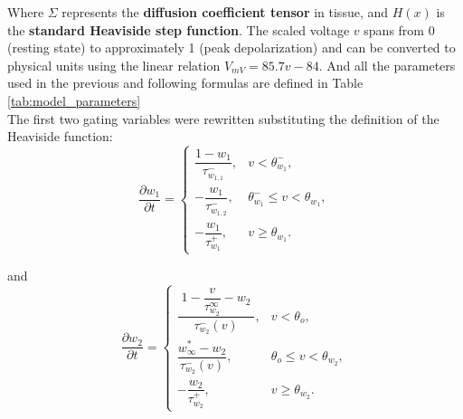 \documentclass{Configuration_Files/PoliMi3i_thesis}
\begin{document}
Where $\Sigma$ represents the \textbf{diffusion coefficient tensor} in tissue, and $H(x)$ is the \textbf{standard Heaviside step function}. The scaled voltage $v$ spans from 0 (resting state) to approximately 1 (peak depolarization) and can be converted to physical units using the linear relation $V_{mV} = 85.7v - 84$. And all the parameters used in the previous and following formulas are defined in Table \ref{tab:model_parameters}
\\
The first two gating variables were rewritten substituting the definition of the Heaviside function:
\begin{equation}
\frac{\partial w_1}{\partial t} =
\begin{cases}
\dfrac{1-w_1}{\tau_{w_{1,1}}^-}, & v < \theta_{w_1}^-, \\[1.5em]
-\dfrac{w_1}{\tau_{w_{1,2}}^-}, & \theta_{w_1}^- \le v < \theta_{w_1}, \\[1.5em]
-\dfrac{w_1}{\tau_{w_1}^+}, & v \ge \theta_{w_1}.
\end{cases}
\label{eq:vgate}
\end{equation}

and %
\begin{equation}
\frac{\partial w_2}{\partial t} =
\begin{cases}
\dfrac{\;1-\dfrac{v}{\tau_{w_2}^\infty} - w_2\;}{\tau_{w_2}^-(v)}, & v < \theta_o, \\[10pt]
\dfrac{w_\infty^\ast - w_2}{\tau_{w_2}^-(v)}, & \theta_o \le v < \theta_{w_2}, \\[8pt]
-\dfrac{w_2}{\tau_{w_2}^+}, & v \ge \theta_{w_2}.
\end{cases}
\label{eq:wgate}
\end{equation}
\end{document}
